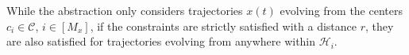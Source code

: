 \documentclass{IEEEtran}
\begin{document}
While the abstraction only considers trajectories $x(t)$ evolving from the centers $c_i\in\mathcal{C}$, $i\in[M_x]$, if the constraints are strictly satisfied with a distance $r$, they are also satisfied for trajectories evolving from anywhere within $\mathcal{H}_i$.

\end{document}
